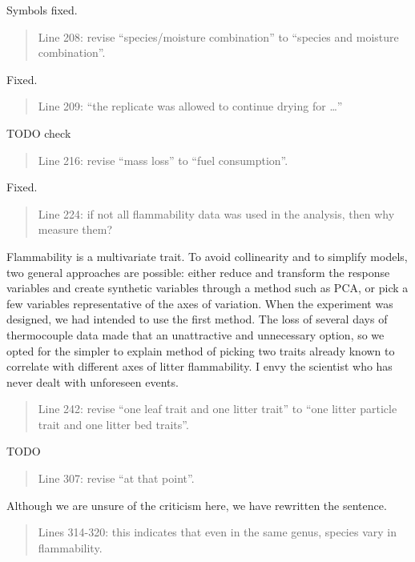 \documentclass[letterpaper, 12pt]{letter}
\begin{document}
\begin{letter}{}
Symbols fixed.

\begin{quote}
Line 208: revise “species/moisture combination” to “species and moisture combination”.
\end{quote}

Fixed.

\begin{quote}
Line 209: “the replicate was allowed to continue drying for …”
\end{quote}

TODO check

\begin{quote}
Line 216: revise “mass loss” to “fuel consumption”.
\end{quote}

Fixed.

\begin{quote}
Line 224: if not all flammability data was used in the analysis, then why measure them?
\end{quote}

Flammability is a multivariate trait. To avoid collinearity and to simplify
models, two general approaches are possible: either reduce and transform the
response variables and create synthetic variables through a method such as PCA,
or pick a few variables representative of the axes of variation. When the
experiment was designed, we had intended to use the first method. The loss of
several days of thermocouple data made that an unattractive and unnecessary
option, so we opted for the simpler to explain method of picking two traits
already known to correlate with different axes of litter flammability. I envy
the scientist who has never dealt with unforeseen events.

\begin{quote}
Line 242: revise “one leaf trait and one litter trait” to “one litter particle trait and one litter bed traits”.
\end{quote}

TODO


\begin{quote}
Line 307: revise “at that point”.
\end{quote}

Although we are unsure of the criticism here, we have rewritten the sentence.

\begin{quote}
Lines 314-320: this indicates that even in the same genus, species vary in flammability.
\end{quote}


\end{letter}
\end{document}
